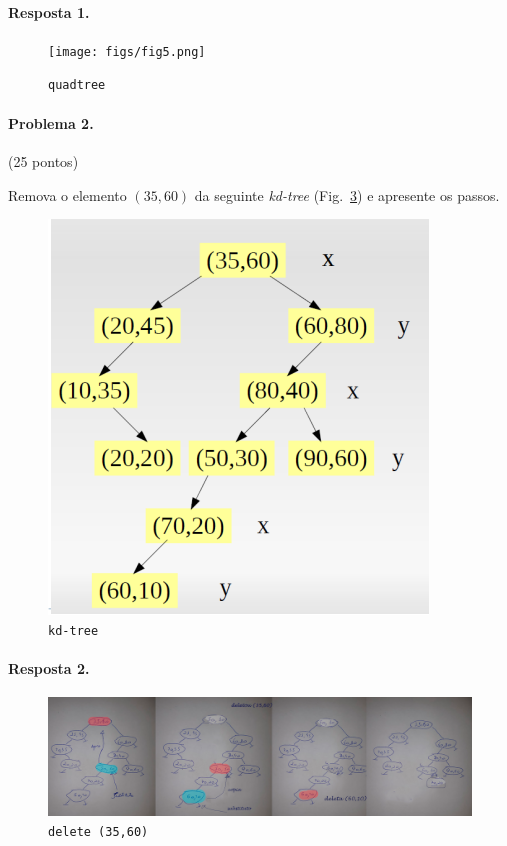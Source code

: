 \documentclass{article}
\begin{document}
\paragraph{Resposta 1.}

\begin{figure}[h]
    \centering
    \texttt{[image: figs/fig5.png]}
    \caption{\texttt{quadtree}}
    \label{fig:prob2}
\end{figure}


\paragraph{Problema 2.} (25 pontos)

Remova o elemento $(35, 60)$ da seguinte \textit{kd-tree} (Fig.~\ref{fig:prob2}) e apresente os passos.

\begin{figure}[h]
    \centering
    \includegraphics[width = 0.4\linewidth]{figs/fig2.png}
    \caption{\texttt{kd-tree}}
    \label{fig:prob2}
\end{figure}

\paragraph{Resposta 2.}

\begin{figure}[h]
    \centering
    \includegraphics[width = 1.0\linewidth]{figs/fig4.png}
    \caption{\texttt{delete (35,60)}}
    \label{fig:prob2}
\end{figure}
\end{document}
